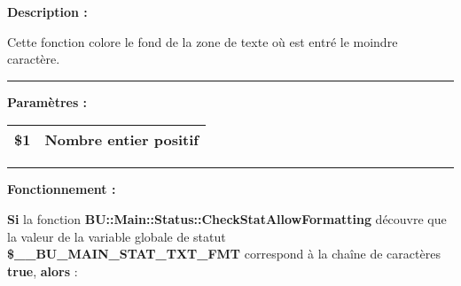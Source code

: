 \documentclass[a4paper,10pt]{article}
\begin{document}
\begin{justify}
    \textbf{Description :}

    Cette fonction colore le fond de la zone de texte où est entré le moindre caractère.
\end{justify}


\par\noindent\rule{\textwidth}{0.4pt}

\begin{justify}
    \textbf{Paramètres :}

    \begin{tabular}{|l|l|}
        \hline
        \textbf{\color{orange}\$1} & Nombre entier positif\\
        \hline
    \end{tabular}
\end{justify}


\par\noindent\rule{\textwidth}{0.4pt}

\begin{justify}
    \textbf{Fonctionnement :}

    \textbf{\color{cond}Si} la fonction \textbf{\color{func}BU::Main::Status::CheckStatAllowFormatting} découvre que la valeur de la variable globale de statut \textbf{\color{vars}\$\_\_BU\_MAIN\_STAT\_TXT\_FMT} correspond à la chaîne de caractères \textbf{true}, \textbf{\color{cond}alors} :
\end{justify}
\end{document}
